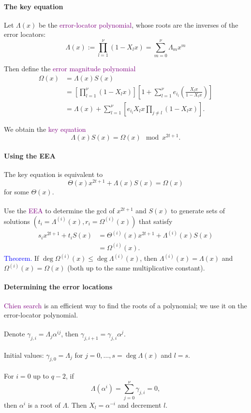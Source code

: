 \documentclass[a4paper, 11pt, openany]{book}
\numberwithin{equation}{section}
\theoremstyle{plain}
\theoremstyle{definition}
\newcommand{\Structure}[1]{\textcolor{blue}{#1}}
\newcommand{\Define}[1]{\textcolor{purple}{#1}}
\begin{document}
\paragraph{The key equation}
Let $\Lambda(x)$ be the \Define{error-locator polynomial}, whose roots are the inverses of the error locators:
$$
	\Lambda(x) := \prod_{l=1}^\nu (1 - X_l x) = \sum_{m = 0}^\nu \Lambda_m x^m
$$

Then define the \Define{error magnitude polynomial}
\begin{align*}
	\Omega(x) &= \Lambda(x) S(x)\\
	&= \left[ \prod_{l=1}^\nu (1 - X_l x) \right] \left[ 1 + \sum_{l=1}^\nu e_{i_l} \left( \frac {X_l x} {1 - X_l x} \right) \right]\\
	&= \Lambda(x) + \sum_{l=1}^\nu \left[ e_{i_l} X_l x \prod_{j \ne l} (1 - X_l x) \right].
\end{align*}

We obtain the \Define{key equation}
$$
	\Lambda(x) S(x) = \Omega(x) \mod x^{2t+1}.
$$


\paragraph{Using the EEA}
The key equation is equivalent to 
$$
	\Theta(x) x^{2t+1} + \Lambda(x) S(x) = \Omega(x)
$$
for some $\Theta(x)$.\\
~\\
Use the \Define{EEA} to determine the gcd of $x^{2t+1}$ and $S(x)$ to generate sets of solutions $(t_i = \Lambda^{(i)}(x), r_i = \Omega^{(i)}(x))$ that satisfy
\begin{align*}
	s_i x^{2t+1} + t_i S(x) &= \Theta^{(i)}(x) x^{2t+1} + \Lambda^{(i)}(x) S(x)\\
	&= \Omega^{(i)}(x).
\end{align*}
\Structure{Theorem.} If $\deg \Omega^{(i)}(x) \le \deg \Lambda^{(i)}(x)$, then $\Lambda^{(i)}(x) = \Lambda(x)$ and $\Omega^{(i)}(x) = \Omega(x)$ (both up to the same multiplicative constant).


\paragraph{Determining the error locations}
\Define{Chien search} is an efficient way to find the roots of a polynomial; we use it on the error-locator polynomial.\\
~\\
Denote $\gamma_{j,i} = \Lambda_j \alpha^{ij}$, then $\gamma_{j,i+1} = \gamma_{j,i} \alpha^j$.\\
~\\
Initial values: $\gamma_{j,0} = \Lambda_j$ for $j=0, \dots, s = \deg \Lambda(x)$ and $l=s$.\\
~\\
For $i=0$ up to $q-2$, if
$$
	\Lambda(\alpha^i) = \sum_{j=0}^\nu \gamma_{j,i} = 0,
$$
then $\alpha^i$ is a root of $\Lambda$. Then $X_l = \alpha^{-i}$ and decrement $l$.
\end{document}
